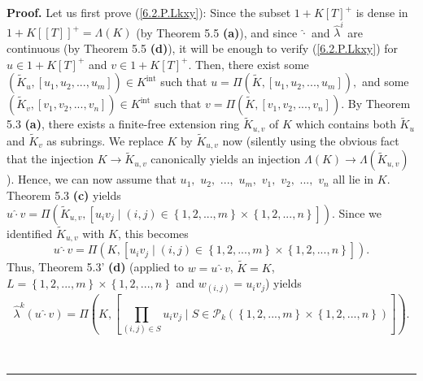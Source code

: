 \documentclass[numbers=enddot,12pt,final,onecolumn,notitlepage]{scrartcl}%
\newenvironment{proof}[1][Proof]{\noindent\textbf{#1.} }{\ \rule{0.5em}{0.5em}}
\begin{document}
\begin{proof}
Let us first prove (\ref{6.2.P.Lkxy}): Since the subset $1+K\left[  T\right]
^{+}$ is dense in $1+K\left[  \left[  T\right]  \right]  ^{+}=\Lambda\left(
K\right)  $ (by Theorem 5.5 \textbf{(a)}), and since $\widehat{\cdot}$ and
$\widehat{\lambda}^{i}$ are continuous (by Theorem 5.5 \textbf{(d)}), it will
be enough to verify (\ref{6.2.P.Lkxy}) for $u\in1+K\left[  T\right]  ^{+}$ and
$v\in1+K\left[  T\right]  ^{+}$. Then, there exist some $\left(
\widetilde{K}_{u},\left[  u_{1},u_{2},...,u_{m}\right]  \right)  \in
K^{\operatorname*{int}}$ such that $u=\Pi\left(  \widetilde{K},\left[
u_{1},u_{2},...,u_{m}\right]  \right)  ,$ and some $\left(  \widetilde{K}%
_{v},\left[  v_{1},v_{2},...,v_{n}\right]  \right)  \in K^{\operatorname*{int}%
}$ such that $v=\Pi\left(  \widetilde{K},\left[  v_{1},v_{2},...,v_{n}\right]
\right)  .$ By Theorem 5.3 \textbf{(a)}, there exists a finite-free extension
ring $\widetilde{K}_{u,v}$ of $K$ which contains both $\widetilde{K}_{u}$ and
$\widetilde{K}_{v}$ as subrings. We replace $K$ by $\widetilde{K}_{u,v}$ now
(silently using the obvious fact that the injection $K\rightarrow
\widetilde{K}_{u,v}$ canonically yields an injection $\Lambda\left(  K\right)
\rightarrow\Lambda\left(  \widetilde{K}_{u,v}\right)  $). Hence, we can now
assume that $u_{1},$ $u_{2},$ $...,$ $u_{m},$ $v_{1},$ $v_{2},$ $...,$ $v_{n}$
all lie in $K$. Theorem 5.3 \textbf{(c)} yields $u\widehat{\cdot}v=\Pi\left(
\widetilde{K}_{u,v},\left[  u_{i}v_{j}\mid\left(  i,j\right)  \in\left\{
1,2,...,m\right\}  \times\left\{  1,2,...,n\right\}  \right]  \right)  $.
Since we identified $\widetilde{K}_{u,v}$ with $K$, this becomes%
\[
u\widehat{\cdot}v=\Pi\left(  K,\left[  u_{i}v_{j}\mid\left(  i,j\right)
\in\left\{  1,2,...,m\right\}  \times\left\{  1,2,...,n\right\}  \right]
\right)  .
\]
Thus, Theorem 5.3' \textbf{(d)} (applied to $w=u\widehat{\cdot}v$,
$\widetilde{K}=K$, $L=\left\{  1,2,...,m\right\}  \times\left\{
1,2,...,n\right\}  $ and $w_{\left(  i,j\right)  }=u_{i}v_{j}$) yields%
\[
\widehat{\lambda}^{k}\left(  u\widehat{\cdot}v\right)  =\Pi\left(  K,\left[
\prod_{\left(  i,j\right)  \in S}u_{i}v_{j}\mid S\in\mathcal{P}_{k}\left(
\left\{  1,2,...,m\right\}  \times\left\{  1,2,...,n\right\}  \right)
\right]  \right)  .
\]



\end{proof}
\end{document}

